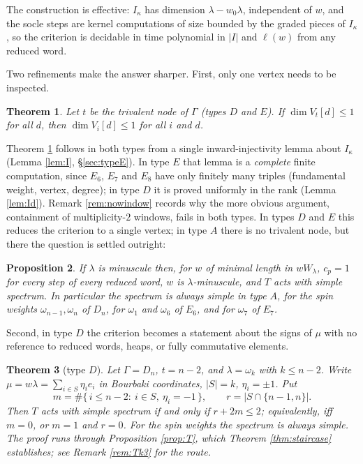 \documentclass[11pt,reqno]{amsart}
\theoremstyle{plain}
\newtheorem{theorem}{Theorem}[section]
\newtheorem{proposition}[theorem]{Proposition}
\theoremstyle{definition}
\newcommand{\om}{\omega}
\newcommand{\la}{\lambda}
\newcommand{\ka}{\kappa}
\begin{document}
The construction is effective: $I_\ka$ has dimension $\la-w_0\la$, independent
of $w$, and the socle steps are kernel computations of size bounded by the
graded pieces of $I_\ka$, so the criterion is decidable in time polynomial in
$|I|$ and $\ell(w)$ from any reduced word.

Two refinements make the answer sharper.  First, only one vertex needs to be
inspected.

\begin{theorem}\label{prop:lemA}
Let $t$ be the trivalent node of $\Gamma$ (types $D$ and $E$).  If
$\dim V_t[d]\le1$ for all $d$, then $\dim V_i[d]\le1$ for all $i$ and $d$.
\end{theorem}

Theorem \ref{prop:lemA} follows in both types from a single inward-injectivity
lemma about $I_\ka$ (Lemma \ref{lem:I}, \S\ref{sec:typeE}).  In type $E$ that
lemma is a \emph{complete} finite computation, since $E_6$, $E_7$ and $E_8$
have only finitely many triples (fundamental weight, vertex, degree); in type
$D$ it is proved uniformly in the rank (Lemma \ref{lem:Id}).  Remark
\ref{rem:nowindow} records why the more obvious argument, containment of
multiplicity-$2$ windows, fails in both types.  In types $D$ and $E$ this reduces the criterion to a
single vertex; in type $A$ there is no trivalent node, but there the question
is settled outright:

\begin{proposition}\label{prop:minuscule}
If $\la$ is minuscule then, for $w$ of minimal length in $wW_\la$, $c_p=1$ for
every step of every reduced word, $w$ is $\la$-minuscule, and $T$ acts with
simple spectrum.  In
particular the spectrum is always simple in type $A$, for the spin weights
$\om_{n-1},\om_n$ of $D_n$, for $\om_1$ and $\om_6$ of $E_6$, and for $\om_7$
of $E_7$.
\end{proposition}

Second, in type $D$ the criterion becomes a statement about the signs of $\mu$
with no reference to reduced words, heaps, or fully commutative elements.

\begin{theorem}[type $D$]\label{thm:typeD}
Let $\Gamma=D_n$, $t=n-2$, and $\la=\om_k$ with $k\le n-2$.  Write
$\mu=w\la=\sum_{i\in S}\eta_ie_i$ in Bourbaki coordinates, $|S|=k$,
$\eta_i=\pm1$.  Put
\[
  m=\#\{\,i\le n-2:\ i\in S,\ \eta_i=-1\,\},
  \qquad
  r=|S\cap\{n-1,n\}| .
\]
Then $T$ acts with simple spectrum if and only if $r+2m\le2$; equivalently, iff
$m=0$, or $m=1$ and $r=0$.  For the spin weights the spectrum is always simple.
The proof runs through Proposition \ref{prop:T}, which
Theorem \ref{thm:staircase} establishes; see Remark \ref{rem:Tk3} for the route.
\end{theorem}
\end{document}
